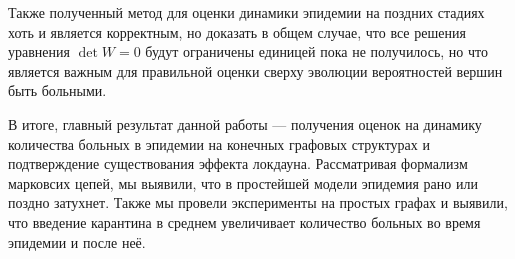 	Также полученный метод для оценки динамики эпидемии на поздних стадиях хоть и является корректным, но доказать в общем случае, что все решения уравнения $\det W = 0$ будут ограничены единицей пока не получилось, но что является важным для правильной оценки сверху эволюции вероятностей вершин быть больными.
	
	В итоге, главный результат данной работы --- получения оценок на динамику количества больных в эпидемии на конечных графовых структурах и подтверждение существования эффекта локдауна. Рассматривая формализм марковсих цепей, мы выявили, что в простейшей модели эпидемия рано или поздно затухнет. Также мы провели эксперименты на простых графах и выявили, что введение карантина в среднем увеличивает количество больных во время эпидемии и после неё.

	\printbibliography
	
